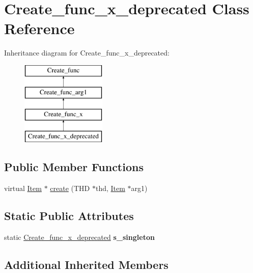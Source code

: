 \hypertarget{classCreate__func__x__deprecated}{}\section{Create\+\_\+func\+\_\+x\+\_\+deprecated Class Reference}
\label{classCreate__func__x__deprecated}
Inheritance diagram for Create\+\_\+func\+\_\+x\+\_\+deprecated\+:\begin{figure}[H]
\begin{center}
\leavevmode
\includegraphics[height=4.000000cm]{classCreate__func__x__deprecated}
\end{center}
\end{figure}
\subsection*{Public Member Functions}
\begin{DoxyCompactItemize}
\item 
virtual \mbox{\hyperlink{classItem}{Item}} $\ast$ \mbox{\hyperlink{classCreate__func__x__deprecated_a462bc6798ecac85b5820b0d13b998507}{create}} (T\+HD $\ast$thd, \mbox{\hyperlink{classItem}{Item}} $\ast$arg1)
\end{DoxyCompactItemize}
\subsection*{Static Public Attributes}
\begin{DoxyCompactItemize}
\item 
\mbox{\label{classCreate__func__x__deprecated_a341690a56cc353acc071755cc5bee376}} 
static \mbox{\hyperlink{classCreate__func__x__deprecated}{Create\+\_\+func\+\_\+x\+\_\+deprecated}} {\bfseries s\+\_\+singleton}
\end{DoxyCompactItemize}
\subsection*{Additional Inherited Members}


